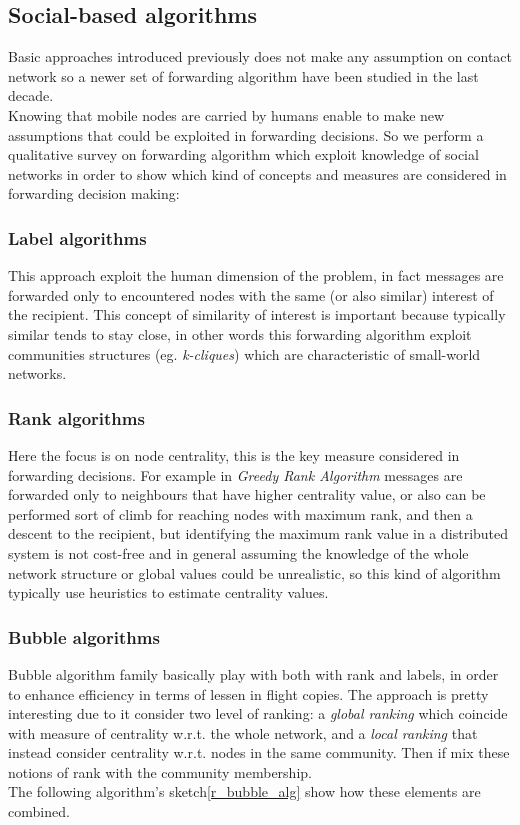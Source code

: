 \subsection{Social-based algorithms}
\label{f_social}
Basic approaches introduced previously does not make any assumption on contact network so a newer set of forwarding algorithm have been studied in the last decade. \\
Knowing that mobile nodes are carried by humans enable to make new assumptions that could be exploited in forwarding decisions. So we perform a qualitative survey on forwarding algorithm which exploit knowledge of social networks in order to show which kind of concepts and measures are considered in forwarding decision making:

\subsubsection{Label algorithms}
This approach exploit the human dimension of the problem, in fact messages are forwarded only to encountered nodes with the same (or also similar) interest of the recipient. This concept of similarity of interest is important because typically similar tends to stay close, in other words this forwarding algorithm exploit communities structures (eg. \emph{k-cliques}) which are characteristic of small-world networks.
\subsubsection{Rank algorithms} 
Here the focus is on node centrality, this is the key measure considered in forwarding decisions. For example in \emph{Greedy Rank Algorithm} messages are forwarded only to neighbours that have higher centrality value, or also can be performed sort of climb for reaching nodes with maximum rank, and then a descent to the recipient\cite{PhysRevE.64.046135}, but identifying the maximum rank value in a distributed system is not cost-free and in general assuming the knowledge of the whole network structure or global values could be unrealistic, so this kind of algorithm typically use heuristics to estimate centrality values.

\subsubsection{Bubble algorithms}
\label{f_bubble}
Bubble algorithm\cite{bubble} family basically play with both with rank and labels, in order to enhance efficiency in terms of lessen in flight copies. The approach is pretty interesting due to it consider two level of ranking: a \emph{global ranking} which coincide with measure of centrality w.r.t. the whole network, and a \emph{local ranking} that instead consider centrality w.r.t. nodes in the same community.
Then if mix these notions of rank with the community membership.\\
The following algorithm's sketch\ref{r_bubble_alg} show how these elements are combined.

